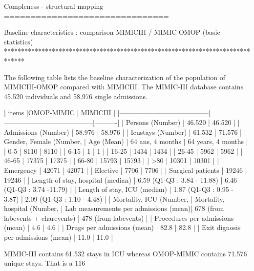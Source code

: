 Compleness - structural mapping 
===============================

Baseline characteristics : comparison MIMICIII / MIMIC OMOP (basic statistics)
******************************************************************************

The following table lists the baseline characterization of the population of MIMICIII-OMOP compared with MIMICIII.
The MIMIC-III database contains 45.520 individuals and 58.976 single admissions.

| items					|OMOP-MIMIC 			        | MIMICIII |
|---------------------------------------|---------------------------------------|----------|
| Persons (Number) 			| 46.520 			        | 46.520 |
| Admissions (Number) 			| 58.976 			        | 58.976 |
| Icustays (Number)   			| 61.532 			        | 71.576 |
| Gender, Female (Number, %
| Age (Mean)  				| 64 ans, 4 months 		        | 64 years, 4 months |
| 0-5  				        |   8110		                |   8110 |
| 6-15                                  |      1		                |      1 |
| 16-25			                |   1434		                |   1434 |
| 26-45  	                        |   5962		                |   5962 |
| 46-65				        |  17375		                |  17375 |
| 66-80				        |  15793		                |  15793 |
| >80				        |  10301		                |  10301 |
| Emergency                             |  42071	                        | 42071 |
| Elective		                |   7706                                | 7706 |
| Surgical patients		        | 19246 		                | 19246 |
| Length of stay, hospital (median) 	| 6.59 (Q1-Q3 : 3.84 - 11.88) 	        | 6.46 (Q1-Q3 : 3.74 -11.79) |
| Length of stay, ICU (median)      	| 1.87 (Q1-Q3 : 0.95 - 3.87)  	        | 2.09 (Q1-Q3 : 1.10 - 4.48) |
| Mortality, ICU (Number, %
| Mortality, hospital (Number, %
| Lab measurements per admissions (mean)| 678  (from labevents + charevents)    | 478 (from labevents) |
| Procedures per admissions (mean)      | 4.6                                   | 4.6 |
| Drugs per admissions (mean)           | 82.8                                  | 82.8 |
| Exit dignosis per admissions (mean)   | 11.0                                  | 11.0 |

MIMIC-III contains 61.532 stays in ICU whereas OMOP-MIMIC contains 71.576 unique stays.
That is a 116%

